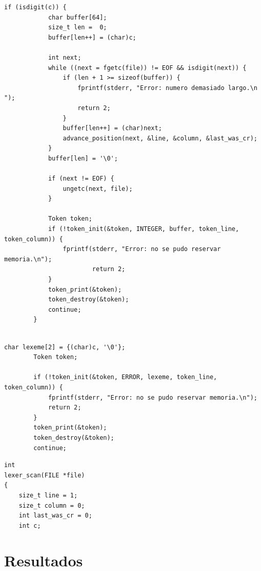 \documentclass[12pt,letterpaper]{article}
\begin{document}
\begin{lstlisting}[style=modernc, caption={\texttt{lexer\_scan}, reconocimiento de números enteros.}]
        if (isdigit(c)) {
            char buffer[64];
            size_t len =  0;
            buffer[len++] = (char)c;

            int next;
            while ((next = fgetc(file)) != EOF && isdigit(next)) {
                if (len + 1 >= sizeof(buffer)) {
                    fprintf(stderr, "Error: numero demasiado largo.\n ");
                    return 2;
                }
                buffer[len++] = (char)next;
                advance_position(next, &line, &column, &last_was_cr);
            }
            buffer[len] = '\0';
            
            if (next != EOF) {
                ungetc(next, file);
            }

            Token token;
            if (!token_init(&token, INTEGER, buffer, token_line, token_column)) {
                fprintf(stderr, "Error: no se pudo reservar memoria.\n");
                        return 2;                        
            }
            token_print(&token);
            token_destroy(&token);
            continue;
        }
  
\end{lstlisting}

\begin{lstlisting}[style=modernc, caption={\texttt{lexer\_scan}, manejo de diagnóstico con token ERROR.}]
        char lexeme[2] = {(char)c, '\0'};
        Token token;
        
        if (!token_init(&token, ERROR, lexeme, token_line, token_column)) {
            fprintf(stderr, "Error: no se pudo reservar memoria.\n");
            return 2;
        }
        token_print(&token);
        token_destroy(&token);
        continue;
\end{lstlisting}

\begin{lstlisting}[style=modernc, caption={\texttt{lexer\_scan}, manejo de diagnóstico con token ERROR.}]
int
lexer_scan(FILE *file)
{
    size_t line = 1;
    size_t column = 0;
    int last_was_cr = 0;
    int c;
\end{lstlisting}

\section*{Resultados}
\end{document}
